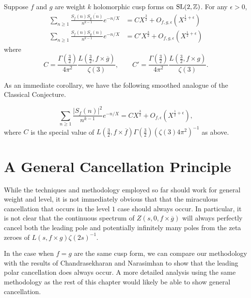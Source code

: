 \begin{theorem}\label{thm:second_moment_Sf}
  Suppose $f$ and $g$ are weight $k$ holomorphic cusp forms on $\operatorname{SL}(2, \mathbb{Z})$.
  For any $\epsilon > 0$,
  \begin{align}
    \sum_{n \geq 1} \frac{S_f(n) \overline{S_g(n)}}{n^{k-1}} e^{-n/X} &= C X^{\frac{3}{2}}
    + O_{f,g,\epsilon} (X^{\frac{1}{2} + \epsilon}) \\
    \sum_{n \geq 1} \frac{S_f(n) S_g(n)}{n^{k-1}} e^{-n/X} &= C' X^{\frac{3}{2}} +
    O_{f,g,\epsilon} (X^{\frac{1}{2} + \epsilon})
  \end{align}
  where
  \begin{equation}
    C = \frac{\Gamma(\frac{3}{2})}{4\pi^2} \frac{L(\frac{3}{2}, f \times
    \overline{g})}{\zeta(3)},
    \qquad C' = \frac{\Gamma(\frac{3}{2})}{4\pi^2} \frac{L(\frac{3}{2}, f \times
    g)}{\zeta(3)}.
  \end{equation}
\end{theorem}



As an immediate corollary, we have the following smoothed analogue of the Classical
Conjecture.
\begin{corollary}
  \begin{equation}
    \sum_{n \geq 1} \frac{\lvert S_f(n) \rvert^2}{n^{k-1}} e^{-n/X} = C X^{\frac{3}{2}} +
    O_{f,\epsilon} (X^{\frac{1}{2} + \epsilon}),
  \end{equation}
  where $C$ is the special value of $L(\frac{3}{2}, f \times \overline{f})
  \Gamma(\frac{3}{2}) (\zeta(3) 4\pi^2)^{-1}$ as above.
\end{corollary}



\section{A General Cancellation Principle}\label{sec:higherlevel}



While the techniques and methodology employed so far should work for general weight and
level, it is not immediately obvious that that the miraculous cancellation that occurs in
the level $1$ case should always occur.
In particular, it is not clear that the continuous spectrum of $Z(s, 0,f \times
\overline{g})$ will always perfectly cancel both the leading pole and potentially
infinitely many poles from the zeta zeroes of $L(s, f\times g)\zeta(2s)^{-1}$.


In the case when $f=g$ are the same cusp form, we can compare our methodology with the
results of Chandrasekharan and Narasimhan to show that the leading polar cancellation does
always occur.
A more detailed analysis using the same methodology as the rest of this chapter would
likely be able to show general cancellation.


